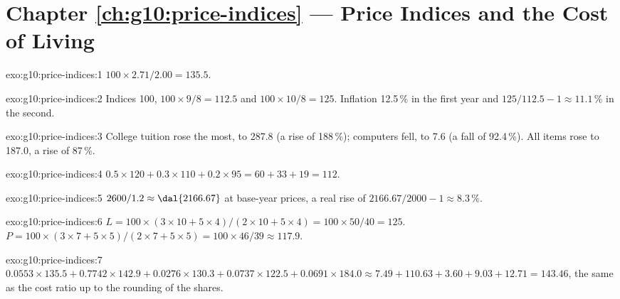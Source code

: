 \section*{Chapter \ref{ch:g10:price-indices} --- Price Indices and the Cost of Living}

\begin{solution}{exo:g10:price-indices:1}
$100 \times 2.71/2.00 = 135.5$.
\end{solution}

\begin{solution}{exo:g10:price-indices:2}
Indices 100, $100 \times 9/8 = 112.5$ and $100 \times 10/8 = 125$. Inflation 12.5\,\% in the first year and $125/112.5 - 1 \approx 11.1\,\%$ in the second.
\end{solution}

\begin{solution}{exo:g10:price-indices:3}
College tuition rose the most, to 287.8 (a rise of 188\,\%); computers fell, to 7.6 (a fall of 92.4\,\%). All items rose to 187.0, a rise of 87\,\%.
\end{solution}

\begin{solution}{exo:g10:price-indices:4}
$0.5 \times 120 + 0.3 \times 110 + 0.2 \times 95 = 60 + 33 + 19 = 112$.
\end{solution}

\begin{solution}{exo:g10:price-indices:5}
$2600/1.2 \approx \text{\dal{2166.67}}$ at base-year prices, a real rise of $2166.67/2000 - 1 \approx 8.3\,\%$.
\end{solution}

\begin{solution}{exo:g10:price-indices:6}
$L = 100 \times (3 \times 10 + 5 \times 4)/(2 \times 10 + 5 \times 4) = 100 \times 50/40 = 125$. $P = 100 \times (3 \times 7 + 5 \times 5)/(2 \times 7 + 5 \times 5) = 100 \times 46/39 \approx 117.9$.
\end{solution}

\begin{solution}{exo:g10:price-indices:7}
$0.0553 \times 135.5 + 0.7742 \times 142.9 + 0.0276 \times 130.3 + 0.0737 \times 122.5 + 0.0691 \times 184.0 \approx 7.49 + 110.63 + 3.60 + 9.03 + 12.71 = 143.46$, the same as the
cost ratio up to the rounding of the shares.
\end{solution}

